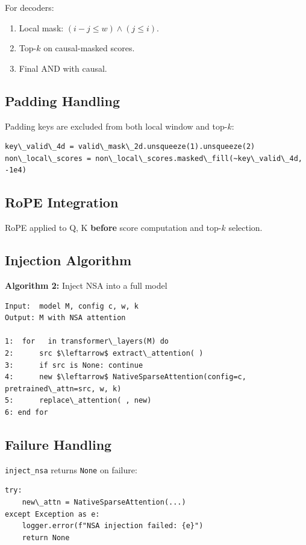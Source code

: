 For decoders:
\begin{enumerate}
\item Local mask: $(i - j \leq w) \land (j \leq i)$.
\item Top-$k$ on causal-masked scores.
\item Final AND with causal.

\end{enumerate}
\subsection{Padding Handling}

Padding keys are excluded from both local window and top-$k$:

\begin{lstlisting}
key\_valid\_4d = valid\_mask\_2d.unsqueeze(1).unsqueeze(2)
non\_local\_scores = non\_local\_scores.masked\_fill(~key\_valid\_4d, -1e4)
\end{lstlisting}

\subsection{RoPE Integration}

RoPE applied to Q, K \textbf{before} score computation and top-$k$ selection.

\subsection{Injection Algorithm}

\textbf{Algorithm 2:} Inject NSA into a full model
\begin{lstlisting}
Input:  model M, config c, w, k
Output: M with NSA attention

1:  for   in transformer\_layers(M) do
2:      src $\leftarrow$ extract\_attention( )
3:      if src is None: continue
4:      new $\leftarrow$ NativeSparseAttention(config=c, pretrained\_attn=src, w, k)
5:      replace\_attention( , new)
6: end for
\end{lstlisting}

\subsection{Failure Handling}

\texttt{inject\_nsa} returns \texttt{None} on failure:

\begin{lstlisting}
try:
    new\_attn = NativeSparseAttention(...)
except Exception as e:
    logger.error(f"NSA injection failed: {e}")
    return None
\end{lstlisting}

